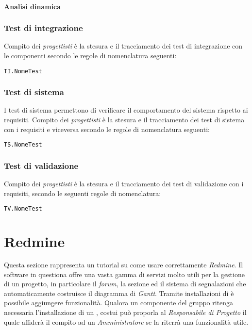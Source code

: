 \documentclass{scalatekids-article}
\begin{document}
\paragraph{Analisi dinamica}

\subsubsection{Test di integrazione}

Compito dei \textit{progettisti} è la stesura e il tracciamento dei test di
integrazione con le componenti secondo le regole di nomenclatura seguenti:

\begin{center}
  \verb=TI.NomeTest=
\end{center}

\subsubsection{Test di sistema}

I test di sistema permettono di verificare il comportamento del sistema rispetto
ai requisiti. Compito dei \textit{progettisti} è la stesura e il tracciamento dei test di
sistema con i requisiti e viceversa secondo le regole di nomenclatura seguenti:

\begin{center}
  \verb=TS.NomeTest=
\end{center}

\subsubsection{Test di validazione}

Compito dei \textit{progettisti} è la stesura e il tracciamento dei test di validazione
con i requisiti, secondo le seguenti regole di nomenclatura:

\begin{center}
  \verb=TV.NomeTest=
\end{center}


\newpage
\appendix

\section{Redmine}

\label{sec:redmine}
Questa sezione rappresenta un tutorial su come usare correttamente \textit{Redmine}. Il software in questiona offre una vasta gamma di servizi molto utili per la gestione di un progetto, in particolare il \textit{forum}, la sezione  ed il sistema di segnalazioni che automaticamente costruisce il diagramma di \textit{Gantt}. Tramite installazioni di  è possibile aggiungere funzionalità. Qualora un componente del gruppo ritenga necessaria l'installazione di un , costui può proporla al \textit{Responsabile di Progetto} il quale affiderà il compito ad un \textit{Amministratore} se la riterrà una funzionalità utile.
\end{document}
